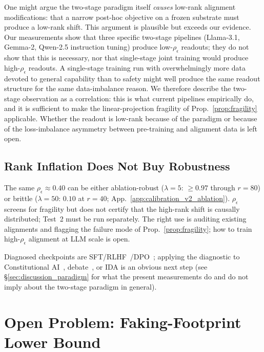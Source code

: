 \documentclass[10pt]{article}
\theoremstyle{definition}
\theoremstyle{remark}
\begin{document}
One might argue the two-stage paradigm
itself \emph{causes} low-rank alignment modifications:
that a narrow post-hoc objective on a frozen substrate
must produce a low-rank shift.  This argument is
plausible but exceeds our evidence.  Our measurements
show that three specific two-stage pipelines
(Llama-3.1, Gemma-2, Qwen-2.5 instruction tuning)
produce low-$\rho_{\epsilon}$ readouts; they do not
show that this is necessary, nor that single-stage
joint training would produce high-$\rho_{\epsilon}$
readouts.  A single-stage training run with
overwhelmingly more data devoted to general capability
than to safety might well produce the same readout
structure for the same data-imbalance reason.  We
therefore describe the two-stage observation as a
correlation: this is what current pipelines empirically
do, and it is sufficient to make the linear-projection
fragility of Prop.~\ref{prop:fragility} applicable.
Whether the readout is low-rank because of the paradigm
or because of the loss-imbalance asymmetry between
pre-training and alignment data is left open.

\subsection{Rank Inflation Does Not Buy Robustness}
\label{sec:discussion_position}

The same $\rho_{\epsilon} \approx 0.40$ can be either
ablation-robust ($\lambda=5$: $\geq 0.97$ through
$r=80$) or brittle ($\lambda=50$: $0.10$ at $r=40$;
App.~\ref{app:calibration_v2_ablation}).
$\rho_{\epsilon}$ screens for fragility but does not
certify that the high-rank shift is causally
distributed; Test~2 must be run separately.  The right
use is auditing existing alignments and flagging the
failure mode of Prop.~\ref{prop:fragility}; how to
train high-$\rho_{\epsilon}$ alignment at LLM scale is
open.

Diagnosed checkpoints are SFT/RLHF~\citep{ouyang2022}/DPO~\citep{rafailov2023dpo};
applying the diagnostic to Constitutional AI~\citep{bai2022},
debate~\citep{irving2018ai}, or IDA is an obvious next
step (see \S\ref{sec:discussion_paradigm} for what the
present measurements do and do not imply about the
two-stage paradigm in general).


\section{Open Problem: Faking-Footprint Lower Bound}
\label{sec:open}
\end{document}
